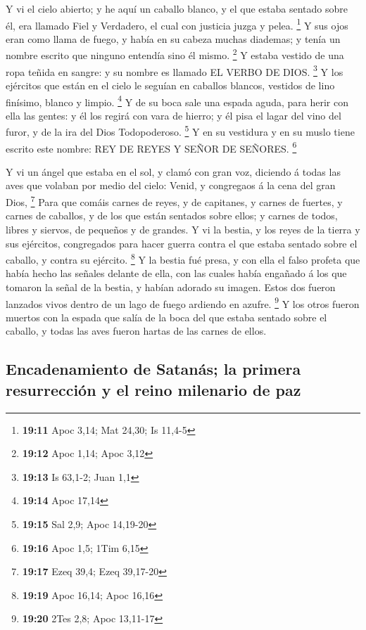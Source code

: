  Y vi el cielo abierto; y he aquí un caballo blanco, y el
que estaba sentado sobre él, era llamado Fiel y Verdadero, el cual con
justicia juzga y pelea. \footnote{\textbf{19:11} Apoc 3,14; Mat 24,30;
  Is 11,4-5}  Y sus ojos eran como llama de fuego, y
había en su cabeza muchas diademas; y tenía un nombre escrito que
ninguno entendía sino él mismo. \footnote{\textbf{19:12} Apoc 1,14; Apoc
  3,12}  Y estaba vestido de una ropa teñida en sangre: y
su nombre es llamado EL VERBO DE DIOS. \footnote{\textbf{19:13} Is
  63,1-2; Juan 1,1}  Y los ejércitos que están en el
cielo le seguían en caballos blancos, vestidos de lino finísimo, blanco
y limpio. \footnote{\textbf{19:14} Apoc 17,14}  Y de su
boca sale una espada aguda, para herir con ella las gentes: y él los
regirá con vara de hierro; y él pisa el lagar del vino del furor, y de
la ira del Dios Todopoderoso. \footnote{\textbf{19:15} Sal 2,9; Apoc
  14,19-20}  Y en su vestidura y en su muslo tiene
escrito este nombre: REY DE REYES Y SEÑOR DE SEÑORES. \footnote{\textbf{19:16}
  Apoc 1,5; 1Tim 6,15}

 Y vi un ángel que estaba en el sol, y clamó con gran
voz, diciendo á todas las aves que volaban por medio del cielo: Venid, y
congregaos á la cena del gran Dios, \footnote{\textbf{19:17} Ezeq 39,4;
  Ezeq 39,17-20}  Para que comáis carnes de reyes, y de
capitanes, y carnes de fuertes, y carnes de caballos, y de los que están
sentados sobre ellos; y carnes de todos, libres y siervos, de pequeños y
de grandes.  Y vi la bestia, y los reyes de la tierra y
sus ejércitos, congregados para hacer guerra contra el que estaba
sentado sobre el caballo, y contra su ejército. \footnote{\textbf{19:19}
  Apoc 16,14; Apoc 16,16}  Y la bestia fué presa, y con
ella el falso profeta que había hecho las señales delante de ella, con
las cuales había engañado á los que tomaron la señal de la bestia, y
habían adorado su imagen. Estos dos fueron lanzados vivos dentro de un
lago de fuego ardiendo en azufre. \footnote{\textbf{19:20} 2Tes 2,8;
  Apoc 13,11-17}  Y los otros fueron muertos con la
espada que salía de la boca del que estaba sentado sobre el caballo, y
todas las aves fueron hartas de las carnes de ellos.

\hypertarget{encadenamiento-de-satanuxe1s-la-primera-resurrecciuxf3n-y-el-reino-milenario-de-paz}{%
\subsection{Encadenamiento de Satanás; la primera resurrección y el
reino milenario de
paz}\label{encadenamiento-de-satanuxe1s-la-primera-resurrecciuxf3n-y-el-reino-milenario-de-paz}}

